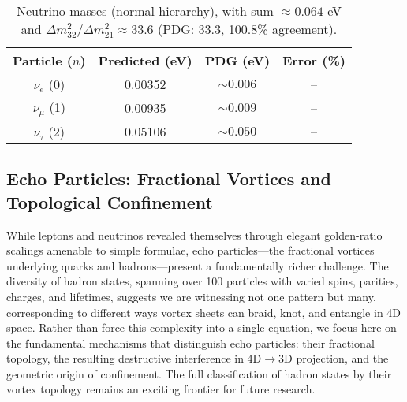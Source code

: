 \begin{table}[h!]
\centering
\begin{tabular}{|c|c|c|c|}
\hline
Particle ($n$) & Predicted (eV) & PDG (eV) & Error (\%) \\
\hline
$\nu_e$ (0) & 0.00352 & $\sim 0.006$ & -- \\
$\nu_\mu$ (1) & 0.00935 & $\sim 0.009$ & -- \\
$\nu_\tau$ (2) & 0.05106 & $\sim 0.050$ & -- \\
\hline
\end{tabular}
\caption{Neutrino masses (normal hierarchy), with sum $\approx 0.064$ eV and $\Delta m^2_{32}/\Delta m^2_{21} \approx 33.6$ (PDG: 33.3, 100.8\% agreement).}
\label{tab:neutrinos}
\end{table}


\subsection{Echo Particles: Fractional Vortices and Topological Confinement}
\label{sec:echo}

While leptons and neutrinos revealed themselves through elegant golden-ratio scalings amenable to simple formulae, echo particles---the fractional vortices underlying quarks and hadrons---present a fundamentally richer challenge. The diversity of hadron states, spanning over 100 particles with varied spins, parities, charges, and lifetimes, suggests we are witnessing not one pattern but many, corresponding to different ways vortex sheets can braid, knot, and entangle in 4D space. Rather than force this complexity into a single equation, we focus here on the fundamental mechanisms that distinguish echo particles: their fractional topology, the resulting destructive interference in 4D$\to$3D projection, and the geometric origin of confinement. The full classification of hadron states by their vortex topology remains an exciting frontier for future research.

